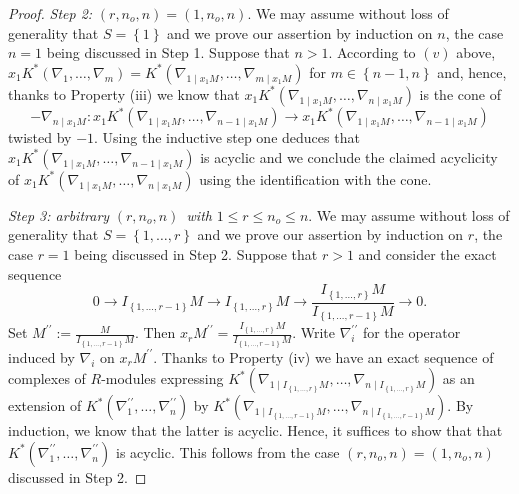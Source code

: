 \documentclass[10pt,a4paper]{amsart}
\begin{document}
\begin{proof}
\emph{Step 2: }$\left( r,n_{o},n\right) =\left( 1,n_{o},n\right) $. We may
assume without loss of generality that $S=\left\{ 1\right\} $ and we prove
our assertion by induction on $n$, the case $n=1$ being discussed in Step 1. 
Suppose that $n>1$. According to $\left( v\right) $
above, $x_{1}K^\ast\left( \nabla _{1},\ldots,\nabla _{m}\right) =K^{\ast
}\left( \nabla _{1\mid x_{1}M},\ldots,\nabla _{m\mid x_{1}M}\right) $ for $m\in
\left\{ n-1,n\right\} $ and, hence, thanks to Property (iii) we know
that $x_{1}K^\ast\left( \nabla _{1\mid
x_{1}M},\ldots,\nabla _{n\mid x_{1}M}\right) $ is the cone of
$$ -\nabla
_{n\mid x_{1}M}:x_{1}K^\ast\left( \nabla _{1\mid x_{1}M},\ldots,\nabla
_{n-1\mid x_{1}M}\right) \rightarrow x_{1}K^\ast\left( \nabla _{1\mid
x_{1}M},\ldots,\nabla _{n-1\mid x_{1}M}\right)$$twisted by $-1$. Using the inductive step one deduces that  $
x_{1}K^\ast\left( \nabla _{1\mid x_{1}M},\ldots,\nabla _{n-1\mid
x_{1}M}\right) $ is acyclic and we conclude the claimed acyclicity of $
x_{1}K^\ast\left( \nabla _{1\mid x_{1}M},\ldots,\nabla _{n\mid
x_{1}M}\right) $ using the identification with the cone.

\emph{Step 3: arbitrary }$\left( r,n_{o},n\right) $\emph{\ with }$1\leq
r\leq n_{o}\leq n$. We may assume without loss of generality that $S=\left\{
1,\ldots,r\right\} $ and we prove our assertion by induction on $r$, the case $
r=1$ being discussed in Step 2. Suppose that $r>1$ and consider
the exact sequence
\begin{equation*}
0\longrightarrow I_{\left\{ 1,\ldots,r-1\right\} }M\longrightarrow I_{\left\{
1,\ldots,r\right\} }M\longrightarrow \frac{I_{\left\{ 1,\ldots,r\right\} }M}{
I_{\left\{ 1,\ldots,r-1\right\} }M}\longrightarrow 0\text{.}
\end{equation*}
Set $M^{\prime \prime }:=\frac{M}{I_{\left\{ 1,\ldots,r-1\right\} }M}$. Then $
x_{r}M^{\prime \prime }=\frac{I_{\left\{ 1,\ldots,r\right\} }M}{I_{\left\{
1,\ldots,r-1\right\} }M}$. Write $\nabla
_{i}^{\prime \prime }$ for the operator induced by $\nabla_i$ on $x_{r}M^{\prime \prime }$.
Thanks to Property (iv)  we have an exact sequence of complexes of $R$-modules expressing $K^\ast\left( \nabla _{1\mid I_{\left\{
1,\ldots,r\right\} }M},\ldots,\nabla _{n\mid I_{\left\{ 1,\ldots,r\right\} }M}\right)$ as an extension of 
$K^\ast\left( \nabla _{1}^{\prime \prime },\ldots,\nabla
_{n}^{\prime \prime }\right)$ by $K^\ast\left( \nabla _{1\mid I_{\left\{
1,\ldots,r-1\right\} }M},\ldots,\nabla _{n\mid I_{\left\{ 1,\ldots,r-1\right\}
}M}\right) $.  By induction, we know that the latter is acyclic. Hence, it suffices to show that  that $K^\ast\left( \nabla _{1}^{\prime \prime },\ldots,\nabla
_{n}^{\prime \prime }\right)$ is acyclic. This follows from the case $\left(
r,n_{o},n\right) =\left( 1,n_{o},n\right) $ discussed in Step 2.
\end{proof}
\end{document}
